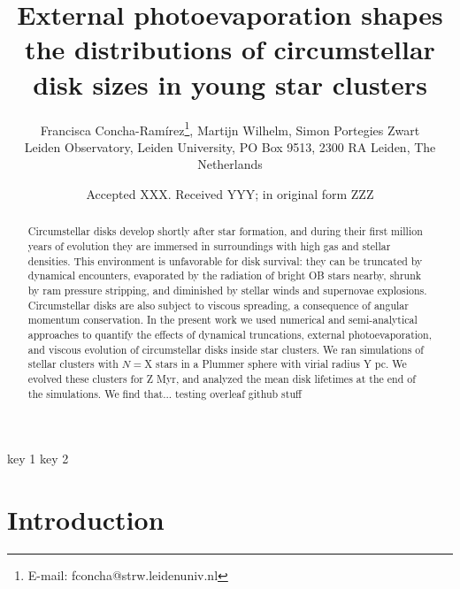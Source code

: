 \documentclass[fleqn,usenatbib]{mnras}
\title[External photoevaporation of disks in young star clusters]{External photoevaporation shapes the distributions of circumstellar disk sizes in young star clusters}
\author[Concha-Ramírez et al.]{
Francisca Concha-Ramírez\thanks{E-mail: fconcha@strw.leidenuniv.nl},
Martijn Wilhelm,
Simon Portegies Zwart
\\
Leiden Observatory, Leiden University, PO Box 9513, 2300 RA Leiden, The Netherlands\\
}
\date{Accepted XXX. Received YYY; in original form ZZZ}
\newcommand\note[1]{{\colorbox{yellow!60}{\color{magenta}#1}}}
\begin{document}
\label{firstpage}
\pagerange{\pageref{firstpage}--\pageref{lastpage}}
\maketitle

\begin{abstract}
Circumstellar disks develop shortly after star formation, and during their first million years of evolution they are immersed in surroundings with high gas and stellar densities. This environment is unfavorable for disk survival: they can be truncated by dynamical encounters, evaporated by the radiation of bright OB stars nearby, shrunk by ram pressure stripping, and diminished by stellar winds and supernovae explosions. Circumstellar disks are also subject to viscous spreading, a consequence of angular momentum conservation. In the present work we used numerical and semi-analytical approaches to quantify the effects of dynamical truncations, external photoevaporation, and viscous evolution of circumstellar disks inside star clusters. We ran simulations of stellar clusters with $N=$\note{X} stars in a Plummer sphere with virial radius \note{Y pc}. We evolved these clusters for \note{Z} Myr, and analyzed the mean disk lifetimes at the end of the simulations. \note{We find that...} testing overleaf github stuff
\end{abstract}

\begin{keywords}
key 1 key 2
\end{keywords}

\section{Introduction}
\label{sec:introduction}
\end{document}
